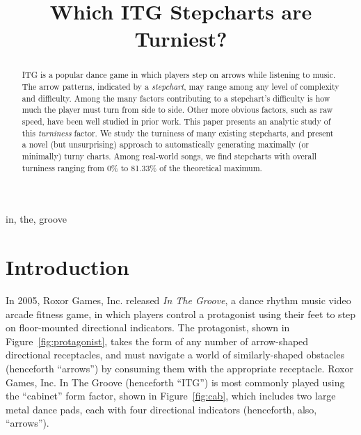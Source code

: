 \documentclass[10pt]{sigplanconf}
\begin{document}
\copyrightdata{}


\title{
Which ITG Stepcharts are Turniest?
}


\maketitle

\begin{abstract}
	ITG is a popular dance game in which players step on arrows while listening to music. The arrow patterns, indicated by a {\em stepchart}, may range among any level of complexity and difficulty. Among the many factors contributing to a stepchart's difficulty is how much the player must turn from side to side.
	Other more obvious factors, such as raw speed, have been well studied in prior work. %
	This paper presents an analytic study of this {\em turniness} factor.
	We study the turniness of many existing stepcharts, and present a novel (but unsurprising) approach to automatically generating maximally (or minimally) turny charts.
	Among real-world songs, we find stepcharts with overall turniness ranging from 0\% to 81.33\% of the theoretical maximum.


\end{abstract}


\keywords
in, the, groove


\section{Introduction}

In 2005, Roxor Games, Inc. released {\em In The Groove}, a dance rhythm music video arcade fitness game, in which players control a protagonist using their feet to step on floor-mounted directional indicators. The protagonist, shown in Figure~\ref{fig:protagonist}, takes the form of any number of arrow-shaped directional receptacles, and must navigate a world of similarly-shaped obstacles (henceforth ``arrows'') by consuming them with the appropriate receptacle.
Roxor Games, Inc. In The Groove (henceforth ``ITG'') is most commonly played using the ``cabinet'' form factor, shown in Figure~\ref{fig:cab}, which includes two large metal dance pads, each with four directional indicators (henceforth, also, ``arrows'').
\end{document}

